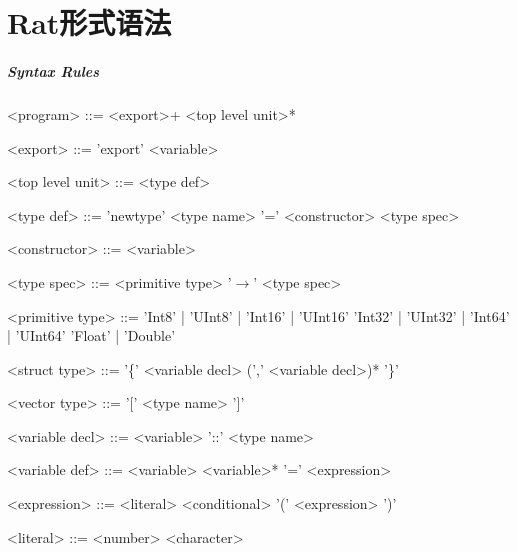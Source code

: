 \chapter{Rat形式语法}\label{chap:formal-syntax}

\setlength{\grammarindent}{10em}
\setlength{\grammarparsep}{5pt}
\paragraph{Syntax Rules}
\begin{grammar}
<program>        ::=    <export>+ <top level unit>*

<export>         ::=    'export' <variable>

<top level unit> ::=    <type def>

<type def>       ::=    'newtype' <type name> '=' <constructor> <type spec>

<constructor>    ::=    <variable>

<type spec>      ::=    <primitive type>
                  '$\to$' <type spec>

<primitive type> ::=    'Int8' | 'UInt8' | 'Int16' | 'UInt16' \alt 'Int32' | 'UInt32' | 'Int64' | 'UInt64'
                 \alt     'Float' | 'Double'

<struct type>    ::=    '\{' <variable decl> (',' <variable decl>)* '\}'

<vector type>    ::=    '[' <type name> ']'

<variable decl>  ::=    <variable> '::' <type name>

<variable def>   ::=    <variable> <variable>* '=' <expression>

<expression>     ::=    <literal>
                 \alt     <conditional>
                 \alt     '(' <expression> ')'

<literal>        ::=    <number>
                 \alt     <character>


\end{grammar}
